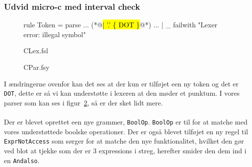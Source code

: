 \subsubsection{Udvid micro-c med interval check}
\begin{figure}[!ht]
\begin{FSharp}
rule Token = parse
  ...
  (*@\hl{| '.'             \{ DOT \}}@*)
  ...
  | _               { failwith "Lexer error: illegal symbol" }
\end{FSharp}
\caption{CLex.fsl}\label{fig:2016:opg4:clex}
\end{figure}
\begin{figure}[!ht]
\caption{CPar.fsy}\label{fig:2016:opg4:cpar}
\end{figure}
\newpage
I ændringerne ovenfor kan det ses at der kun er tilføjet een ny token og det er \Verb|DOT|, dette er så vi kan understøtte i lexeren at den møder et punktum. I vores parser som kan ses i figur~\ref{fig:2016:opg4:cpar}, så er der sket lidt mere.\\\\
Der er blevet oprettet een nye grammer, \Verb|BoolOp|. \Verb|BoolOp| er til for at matche med vores understøttede boolske operationer. Der er også blevet tilføjet en ny regel til \Verb|ExprNotAccess| som sørger for at matche den nye funktionalitet, hvilket den gør ved blot at tjekke som der er 3 expressions i streg, herefter smider den dem ind i en \Verb|Andalso|.
